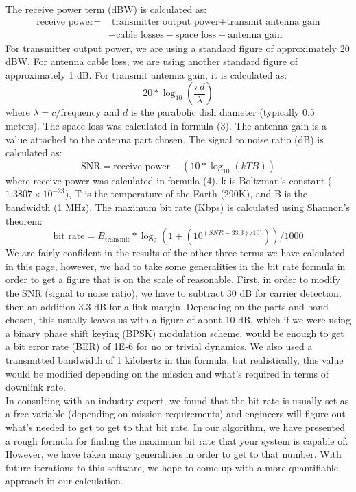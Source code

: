 \documentclass[a4, 12 pt]{article} %
\begin{document}
The receive power term (dBW) is calculated as:
\begin{equation} \begin{aligned} \text{receive power} = & \text{ transmitter output power} + \text{transmit antenna gain} \\ &- \text{cable losses} - \text{space loss} + \text{antenna gain} \end{aligned} \end{equation}
For transmitter output power, we are using a standard figure of approximately 20 dBW, For antenna cable loss, we are using another standard figure of approximately 1 dB. For transmit antenna gain, it is calculated as:
\begin{equation} 20 * \log_{10} \left(\dfrac{\pi d}{ \lambda}\right) \end{equation}
where $\lambda=c / \text{frequency}$ and $d$ is the parabolic dish diameter (typically 0.5 meters). The space loss was calculated in formula (3). The antenna gain is a value attached to the antenna part chosen. The signal to noise ratio (dB) is calculated as:
\begin{equation} \text{SNR} = \text{receive power} - (10 * \log_{10}(kTB))\end{equation}
where receive power was calculated in formula (4). k is Boltzman's constant ($1.3807\times10^{-23}$), T is the temperature of the Earth (290K), and B is the bandwidth (1 MHz). The maximum bit rate (Kbps) is calculated using Shannon's theorem:
\begin{equation} \text{bit rate} = B_{\text{transmit}} * \log_2\left(1 + \left(10^{(SNR - 33.3) / 10)}\right)\right) / 1000 \end{equation}
We are fairly confident in the results of the other three terms we have calculated in this page, however, we had to take some generalities in the bit rate formula in order to get a figure that is on the scale of reasonable. First, in order to modify the SNR (signal to noise ratio), we have to subtract 30 dB for carrier detection, then an addition 3.3 dB for a link margin. Depending on the parts and band chosen, this usually leaves us with a figure of about 10 dB, which if we were using a binary phase shift keying (BPSK) modulation scheme, would be enough to get a bit error rate (BER) of 1E-6 for no or trivial dynamics. We also used a transmitted bandwidth of 1 kilohertz in this formula, but realistically, this value would be modified depending on the mission and what's required in terms of downlink rate.\\[3mm] 
In consulting with an industry expert, we found that the bit rate is usually set as a free variable (depending on mission requirements) and engineers will figure out what's needed to get to get to that bit rate. In our algorithm, we have presented a rough formula for finding the maximum bit rate that your system is capable of. However, we have taken many generalities in order to get to that number. With future iterations to this software, we hope to come up with a more quantifiable approach in our calculation. 
\end{document}
